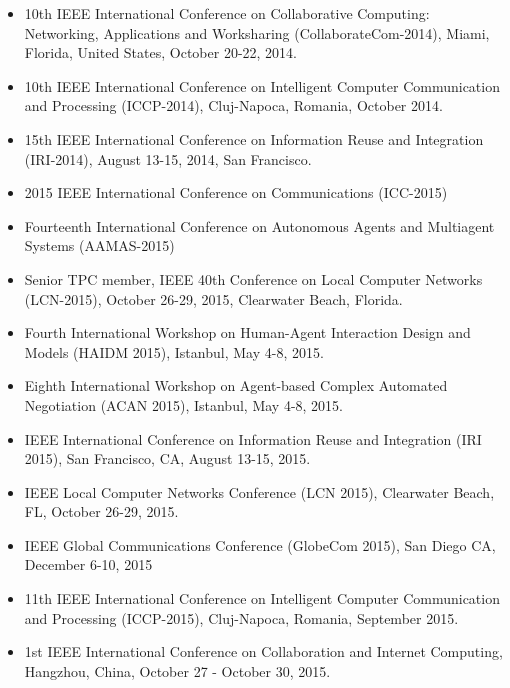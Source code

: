 \begin{itemize}
\item 10th IEEE International Conference on Collaborative Computing: Networking, Applications and Worksharing (CollaborateCom-2014), Miami, Florida, United States, October 20-22, 2014.

\item 10th IEEE International Conference on
Intelligent Computer Communication and Processing (ICCP-2014), Cluj-Napoca, Romania, October 2014.

\item 15th IEEE International Conference on Information Reuse and Integration (IRI-2014), August 13-15, 2014, San Francisco.

\item 2015 IEEE International Conference on Communications (ICC-2015)

\item Fourteenth International Conference on Autonomous Agents and Multiagent Systems (AAMAS-2015)

\item Senior TPC member, IEEE 40th Conference on Local Computer Networks (LCN-2015), October 26-29, 2015, Clearwater Beach, Florida.

\item Fourth International Workshop on Human-Agent Interaction Design and Models (HAIDM 2015), Istanbul, May 4-8, 2015.

\item Eighth International Workshop on Agent-based Complex Automated Negotiation (ACAN 2015), Istanbul, May 4-8, 2015.

\item IEEE International Conference on Information Reuse and Integration (IRI 2015), San Francisco, CA, August 13-15, 2015.

\item IEEE Local Computer Networks Conference (LCN 2015), Clearwater Beach, FL, October 26-29, 2015.

\item IEEE Global Communications Conference (GlobeCom 2015), San Diego CA, December 6-10, 2015

\item 11th IEEE International Conference on
Intelligent Computer Communication and Processing (ICCP-2015), Cluj-Napoca, Romania, September 2015.

\item 1st IEEE International Conference on Collaboration and Internet Computing, Hangzhou, China, October 27 - October 30, 2015.


\end{itemize}
